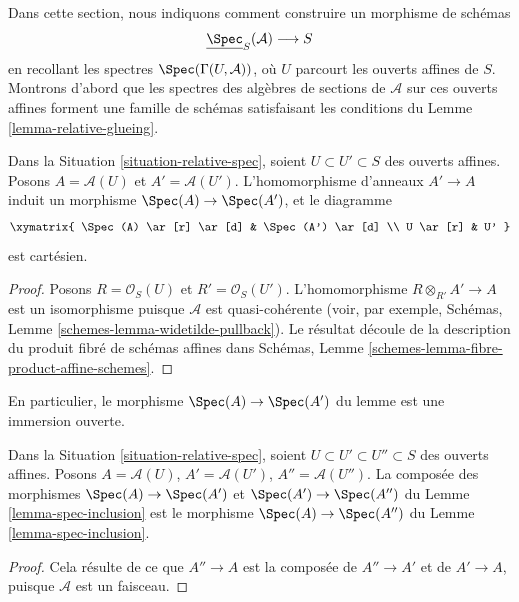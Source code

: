 \noindent
Dans cette section, nous indiquons comment construire un morphisme de schémas
$$
\underline{\Spec}_S(\mathcal{A}) \longrightarrow S
$$
en recollant les spectres $\Spec(\Gamma(U, \mathcal{A}))$, où $U$ parcourt
les ouverts affines de $S$. Montrons d'abord que les spectres des algèbres
de sections de $\mathcal{A}$ sur ces ouverts affines forment une famille
de schémas satisfaisant les conditions du Lemme \ref{lemma-relative-glueing}.

\begin{lemma}
\label{lemma-spec-inclusion}
Dans la Situation \ref{situation-relative-spec}, soient
$U \subset U' \subset S$ des ouverts affines. Posons
$A = \mathcal{A}(U)$ et $A' = \mathcal{A}(U')$.
L'homomorphisme d'anneaux $A' \to A$ induit un morphisme
$\Spec(A) \to \Spec(A')$, et le diagramme
$$
\xymatrix{
\Spec(A) \ar[r] \ar[d] &
\Spec(A') \ar[d] \\
U \ar[r] &
U'
}
$$
est cartésien.
\end{lemma}

\begin{proof}
Posons $R = \mathcal{O}_S(U)$ et $R' = \mathcal{O}_S(U')$.
L'homomorphisme $R \otimes_{R'} A' \to A$ est un isomorphisme puisque
$\mathcal{A}$ est quasi-cohérente (voir, par exemple, Schémas,
Lemme \ref{schemes-lemma-widetilde-pullback}). Le résultat découle de la
description du produit fibré de schémas affines dans Schémas,
Lemme \ref{schemes-lemma-fibre-product-affine-schemes}.
\end{proof}

\noindent
En particulier, le morphisme $\Spec(A) \to \Spec(A')$ du lemme est une
immersion ouverte.

\begin{lemma}
\label{lemma-transitive-spec}
Dans la Situation \ref{situation-relative-spec}, soient
$U \subset U' \subset U'' \subset S$ des ouverts affines. Posons
$A = \mathcal{A}(U)$, $A' = \mathcal{A}(U')$, $A'' = \mathcal{A}(U'')$.
La composée des morphismes $\Spec(A) \to \Spec(A')$ et
$\Spec(A') \to \Spec(A'')$ du Lemme \ref{lemma-spec-inclusion} est le
morphisme $\Spec(A) \to \Spec(A'')$ du Lemme \ref{lemma-spec-inclusion}.
\end{lemma}

\begin{proof}
Cela résulte de ce que $A'' \to A$ est la composée de $A'' \to A'$ et de
$A' \to A$, puisque $\mathcal{A}$ est un faisceau.
\end{proof}


